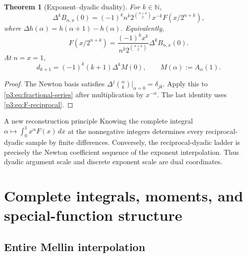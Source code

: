 \documentclass[11pt,oneside]{article}
\newtheorem{theorem}{Theorem}[section]
\theoremstyle{definition}
\theoremstyle{remark}
\newcommand{\N}{\mathbb N}
\newcommand{\rise}[2]{#1^{\overline{#2}}}
\newcommand{\1}{\mathbf 1}
\begin{document}
\begin{theorem}[Exponent--dyadic duality]
\label{p3:thm:exponent-duality}
For $k\in\N$,
\begin{equation}
 \Delta^kB_{n,x}(0)
 =(-1)^k\rise nk2^{\binom{n+k}{2}}x^{-k}F(x/2^{n+k}),         \label{p3:eq:forward-difference}
\end{equation}
where $\Delta h(\alpha)=h(\alpha+1)-h(\alpha)$.  Equivalently,
\begin{equation}
 \boxed{
 F(x/2^{n+k})=
 \frac{(-1)^kx^k}{\rise nk2^{\binom{n+k}{2}}}
 \Delta^kB_{n,x}(0).}
 \label{p3:eq:recover-dyadic}
\end{equation}
At $n=x=1$,
\begin{equation}
 d_{k+1}=(-1)^k(k+1)\Delta^kM(0),\qquad
 M(\alpha):=A_\alpha(1).                                    \label{p3:eq:mom-forward-diff}
\end{equation}
\end{theorem}

\begin{proof}
The Newton basis satisfies $\Delta^j\binom\alpha k|_{\alpha=0}=\delta_{jk}$.  Apply this to
\eqref{p3:eq:fractional-series} after multiplication by $x^{-\alpha}$.  The last identity uses
\eqref{p3:eq:F-reciprocal}.
\end{proof}

\begin{resultbox}{A new reconstruction principle}
Knowing the complete integral $\alpha\mapsto\int_0^1x^\alpha F(x)\,dx$ at the nonnegative
integers determines every reciprocal-dyadic sample by finite differences.  Conversely, the
reciprocal-dyadic ladder is precisely the Newton coefficient sequence of the exponent
interpolation.  Thus dyadic argument scale and discrete exponent scale are dual coordinates.
\end{resultbox}

\section{Complete integrals, moments, and special-function structure}
\label{p3:sec:complete}

\subsection{Entire Mellin interpolation}
\end{document}
